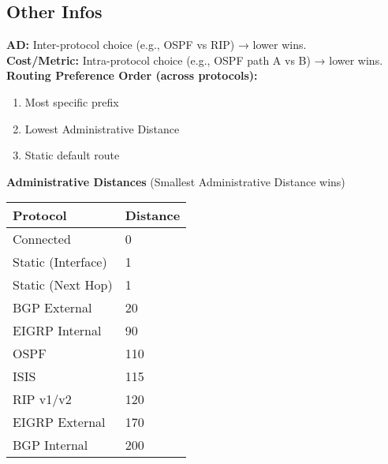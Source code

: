 \begin{multicols*}{5}
		\section{Other Infos}
		\textbf{AD:} Inter-protocol choice (e.g., OSPF vs RIP) → lower wins.\\
		\textbf{Cost/Metric:} Intra-protocol choice (e.g., OSPF path A vs B) → lower wins. \\
		\textbf{Routing Preference Order (across protocols):}
		\begin{enumerate}
			\item Most specific prefix
			\item Lowest Administrative Distance
			\item Static default route
		\end{enumerate}
		\textbf{Administrative Distances} (Smallest Administrative Distance wins) \\
		\begin{tabular}{@{}ll@{}}
			\textbf{Protocol} & \textbf{Distance} \\
			\hline
			Connected & 0 \\
			Static (Interface) & 1 \\
			Static (Next Hop) & 1 \\
			BGP External & 20 \\
			EIGRP Internal & 90 \\
			OSPF & 110 \\
			ISIS & 115 \\
			RIP v1/v2 & 120 \\
			EIGRP External & 170 \\
			BGP Internal & 200 \\
		\end{tabular}
		

\end{multicols*}
